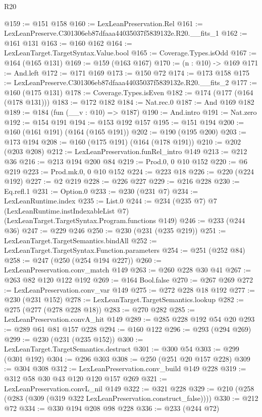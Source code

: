 \begin{lexlean}{R20}
\begin{coremodule}
@159 := @151 @158
@160 := LexLeanPreservation.Rel
@161 := LexLeanPreserve.C301306eb87dfaaa44035037f5839132e.R20.__fits_1
@162 := @161 @131
@163 := @160 @162
@164 := LexLeanTarget.TargetSyntax.Value.bool
@165 := Coverage.Types.isOdd
@167 := @164 (@165 @131)
@169 := @159 (@163 @167)
@170 := (n : @10) -> @169
@171 := And.left
@172 := @171 @169
@173 := @150 @72
@174 := @173 @158
@175 := LexLeanPreserve.C301306eb87dfaaa44035037f5839132e.R20.__fits_2
@177 := @160 (@175 @131)
@178 := Coverage.Types.isEven
@182 := @174 (@177 (@164 (@178 @131)))
@183 := @172 @182
@184 := Nat.rec.{0}
@187 := And @169 @182
@189 := @184 (fun (__v : @10) => @187)
@190 := And.intro
@191 := Nat.zero
@192 := @154 @191
@194 := @153 @192 @157
@195 := @151 @194
@200 := @160 (@161 @191) (@164 (@165 @191))
@202 := @190 (@195 @200)
@203 := @173 @194
@208 := @160 (@175 @191) (@164 (@178 @191))
@210 := @202 (@203 @208)
@212 := LexLeanPreservation.funRel_intro @149
@213 := @212 @36
@216 := @213 @194 @200 @84
@219 := Prod.{0, 0} @10 @152
@220 := @6 @219
@223 := Prod.mk.{0, 0} @10 @152
@224 := @223 @18
@226 := @220 (@224 @192)
@227 := @2 @219
@228 := @226 @227
@229 := @216 @228
@230 := Eq.refl.{1}
@231 := Option.{0}
@233 := @230 (@231 @7)
@234 := LexLeanRuntime.index
@235 := List.{0}
@244 := @234
    (@235 @7)
    @7
    (LexLeanRuntime.instIndexableList @7)
    (LexLeanTarget.TargetSyntax.Program.functions @149)
@246 := @233 (@244 @36)
@247 := @229 @246
@250 := @230 (@231 (@235 @219))
@251 := LexLeanTarget.TargetSemantics.bindAll
@252 := LexLeanTarget.TargetSyntax.Function.parameters
@254 := @251 (@252 @84)
@258 := @247 (@250 (@254 @194 @227))
@260 := LexLeanPreservation.conv_match @149
@263 := @260 @228 @30 @41
@267 := @263 @82 @120 @122 @192
@269 := @164 Bool.false
@270 := @267 @269
@272 := LexLeanPreservation.conv_var @149
@275 := @272 @228 @18 @192
@277 := @230 (@231 @152)
@278 := LexLeanTarget.TargetSemantics.lookup
@282 := @275 (@277 (@278 @228 @18))
@283 := @270 @282
@285 := LexLeanPreservation.convA_hit @149
@289 := @285 @228 @192 @54 @20
@293 := @289 @61 @81 @157 @228
@294 := @160 @122
@296 := @293 (@294 @269)
@299 := @230 (@231 (@235 @152))
@300 := LexLeanTarget.TargetSemantics.destruct
@301 := @300 @54
@303 := @299 (@301 @192)
@304 := @296 @303
@308 := @250 (@251 @20 @157 @228)
@309 := @304 @308
@312 := LexLeanPreservation.conv_build @149 @228
@319 := @312 @58 @30 @43 @120 @120 @157 @269
@321 := LexLeanPreservation.convL_nil @149
@322 := @321 @228
@329 := @210 (@258 (@283 (@309 (@319 @322 LexLeanPreservation.construct_false))))
@330 := @212 @72
@334 := @330 @194 @208 @98 @228
@336 := @233 (@244 @72)

\end{coremodule}
\end{lexlean}
